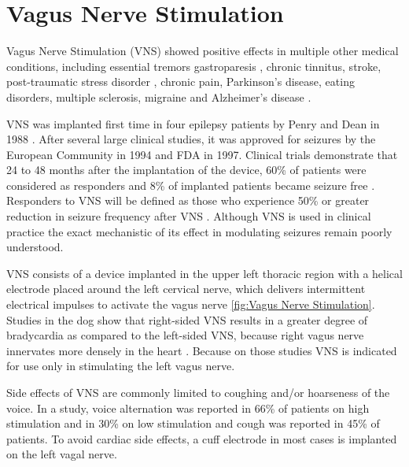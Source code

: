 \section{Vagus Nerve Stimulation}
Vagus Nerve Stimulation (VNS) showed positive effects in multiple other medical conditions, including essential tremors gastroparesis \cite{KRAHL2004135}, chronic tinnitus, stroke, post-traumatic stress disorder \cite{HAYS2013275}, chronic pain, Parkinson's disease, eating disorders, multiple sclerosis, migraine and Alzheimer's disease \cite{BRONCEL202037, BeekwilderBeems2010}.

VNS was implanted first time in four epilepsy patients by Penry and Dean in 1988 \cite{Penry1990}. After several large clinical studies, it was approved for seizures by the European Community in 1994 and FDA in 1997. Clinical trials demonstrate that 24 to 48 months after the implantation of the device, 60\% of patients were considered as responders and 8\% of implanted patients became seizure free \cite{Englot2016}. Responders to VNS will be defined as those who experience 50\% or greater reduction in seizure frequency after VNS \cite{IBRAHIM2017634}. Although VNS is used in clinical practice the exact mechanistic of its effect in modulating seizures remain poorly understood.

VNS consists of a device implanted in the upper left thoracic region with a helical electrode placed around the left cervical nerve, which delivers intermittent electrical impulses to activate the vagus nerve \ref{fig:Vagus Nerve Stimulation}.
Studies in the dog show that right-sided VNS results in a greater degree of bradycardia as compared to the left-sided VNS, because right vagus nerve innervates more densely in the heart \cite{ardell1986selective}. Because on those studies VNS is indicated for use only in stimulating the left vagus nerve.

Side effects of VNS are commonly limited to coughing and/or hoarseness of the voice. In a study, voice alternation was reported in 66\% of patients on high stimulation and in 30\% on low stimulation and cough was reported in 45\% of patients. \cite{ben2001vagus} To avoid cardiac side effects, a cuff electrode in most cases is implanted on the left vagal nerve.

